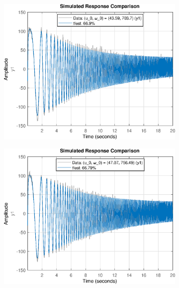 \begin{figure}[H]
    \begin{minipage}{0.32\textwidth}
       \begin{figure}[H]
            \includegraphics[width = \textwidth]{./figs/small_perturbation/time_Compare_1550.eps}
       \end{figure}
    \end{minipage}
    \begin{minipage}{0.32\textwidth}
       \begin{figure}[H]
            \includegraphics[width = \textwidth]{./figs/small_perturbation/time_Compare_1600.eps}

\end{figure}
\end{minipage}
\end{figure}
